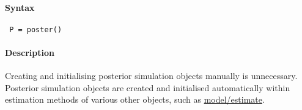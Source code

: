


	\paragraph{Syntax}
 
 \begin{verbatim}
 P = poster()
 \end{verbatim}
 
 \paragraph{Description}
 
 Creating and initialising posterior simulation objects manually is
 unnecessary. Posterior simulation objects are created and initialised
 automatically within estimation methods of various other objects, such
 as \url{model/estimate}.


